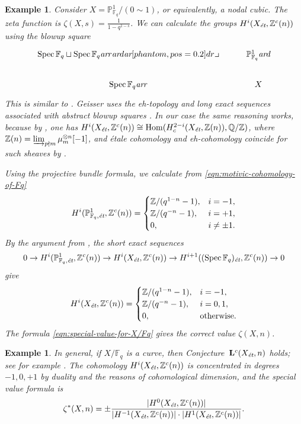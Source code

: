 \documentclass[10pt,a4paper,oneside,draft]{article}
\DeclareMathOperator{\Hom}{Hom}
\DeclareMathOperator{\Spec}{Spec}
\newcommand{\FF}{\mathbb{F}}
\newcommand{\QQ}{\mathbb{Q}}
\newcommand{\ZZ}{\mathbb{Z}}
\newcommand{\PP}{\mathbb{P}}
\newcommand{\ar}{\text{\it ar}}
\newcommand{\et}{\text{\it \'{e}t}}
\newcommand{\tikzpb}{\ar[phantom,pos=0.2]{dr}{\text{\large$\lrcorner$}}}
\theoremstyle{myplain}
\theoremstyle{mydefinition}
\newtheorem{example}[theorem]{Example}
\numberwithin{equation}{section}
\begin{document}
\begin{example}
  Consider $X = \PP^1_{\FF_q}/(0\sim 1)$, or equivalently, a nodal cubic.
  The zeta function is $\zeta (X,s) = \frac{1}{1 - q^{1-s}}$.  We can calculate
  the groups $H^i (X_\et, \ZZ^c (n))$ using the blowup square
  \[ \begin{tikzcd}
      \Spec \FF_q \sqcup \Spec \FF_q \ar{r}\ar{d}\tikzpb & \PP^1_{\FF_q} \ar{d} \\
      \Spec \FF_q \ar{r} & X
    \end{tikzcd} \]
  This is similar to \cite[\S 8, Example~2]{Geisser-2006}. Geisser uses the
  eh-topology and long exact sequences associated with abstract blowup squares
  \cite[Proposition~3.2]{Geisser-2006}. In our case the same reasoning works,
  because by \cite[Theorem~I]{Beshenov-Weil-etale-1}, one has
  $H^i (X_\et, \ZZ^c (n)) \cong \Hom (H^{2-i}_c (X_\et, \ZZ (n)),\QQ/\ZZ)$,
  where $\ZZ (n) = \varinjlim_{p\nmid m} \mu_m^{\otimes n} [-1]$, and \'{e}tale
  cohomology and eh-cohomology coincide for such sheaves by
  \cite[Theorem~3.6]{Geisser-2006}.

  Using the projective bundle formula, we calculate from
  \eqref{eqn:motivic-cohomology-of-Fq}
  \[ H^i (\PP^1_{\FF_q,\et}, \ZZ^c (n)) = \begin{cases}
      \ZZ/(q^{1-n} - 1), & i = -1, \\
      \ZZ/(q^{-n} - 1), & i = +1, \\
      0, & i \ne \pm 1.
    \end{cases} \]
  By the argument from \cite[\S 8, Example~2]{Geisser-2006}, the short exact
  sequences
  \[ 0 \to H^i (\PP^1_{\FF_q,\et}, \ZZ^c (n)) \to
    H^i (X_\et, \ZZ^c (n)) \to
    H^{i+1} ((\Spec \FF_q)_\et, \ZZ^c (n)) \to 0 \]
  give
  \[ H^i (X_\et, \ZZ^c (n)) = \begin{cases}
      \ZZ/(q^{1-n} - 1), & i = -1, \\
      \ZZ/(q^{-n} - 1), & i = 0,1, \\
      0, & \text{otherwise}.
    \end{cases} \]
  The formula \eqref{eqn:special-value-for-X/Fq} gives the correct value
  $\zeta (X,n)$.
\end{example}

\begin{example}
  In general, if $X/\FF_q$ is a curve, then Conjecture~$\mathbf{L}^c (X_\et,n)$
  holds; see for example \cite[Proposition~4.3]{Geisser-2017}. The cohomology
  $H^i (X_\et, \ZZ^c(n))$ is concentrated in degrees $-1, 0, +1$ by duality
  \cite[Theorem~I]{Beshenov-Weil-etale-1} and the reasons of cohomological
  dimension, and the special value formula is
  \[ \zeta^* (X,n) =
    \pm \frac{|H^0 (X_\et, \ZZ^c (n))|}{|H^{-1} (X_\et, \ZZ^c (n))|\cdot |H^1 (X_\et, \ZZ^c (n))|}. \]
\end{example}
\end{document}
